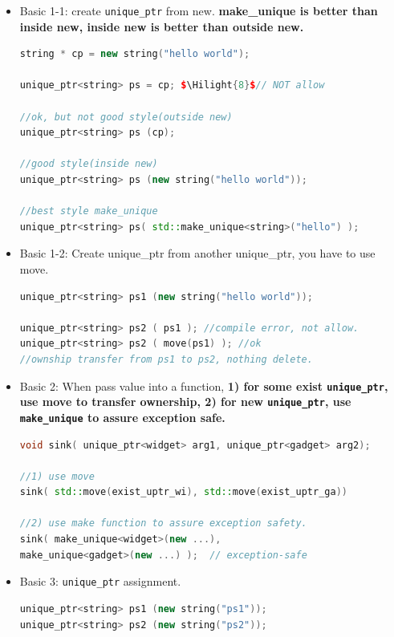 \documentclass[a4paper,12pt,twoside]{book}
\newcommand{\Hilight}[1]{\makebox[0pt][l]{\color{yellow}\rule[-3pt]{#1em}{11pt}}}
\begin{document}
\begin{itemize}

\item Basic 1-1: create \texttt{unique\_ptr} from new.    \textbf{make\_unique is better than inside new, inside new is better than outside new.}
\begin{lstlisting}[frame=single, language=c++]
string * cp = new string("hello world");

unique_ptr<string> ps = cp; $\Hilight{8}$// NOT allow

//ok, but not good style(outside new)
unique_ptr<string> ps (cp);

//good style(inside new)
unique_ptr<string> ps (new string("hello world"));

//best style make_unique
unique_ptr<string> ps( std::make_unique<string>("hello") );
\end{lstlisting}

\item Basic 1-2: Create unique\_ptr from another unique\_ptr, you have to use move.
\begin{lstlisting}[frame=single, language=c++]
unique_ptr<string> ps1 (new string("hello world"));

unique_ptr<string> ps2 ( ps1 ); //compile error, not allow.
unique_ptr<string> ps2 ( move(ps1) ); //ok
//ownship transfer from ps1 to ps2, nothing delete.
\end{lstlisting}

\item Basic 2: When pass value into a function, \textbf{1) for some exist \texttt{unique\_ptr}, use move to transfer ownership, 2) for new \texttt{unique\_ptr}, use \texttt{make\_unique} to assure exception safe.}

\begin{lstlisting}[frame=single, language=c++]
void sink( unique_ptr<widget> arg1, unique_ptr<gadget> arg2);

//1) use move
sink( std::move(exist_uptr_wi), std::move(exist_uptr_ga))

//2) use make function to assure exception safety.
sink( make_unique<widget>(new ...),
make_unique<gadget>(new ...) );  // exception-safe
\end{lstlisting}


\item Basic 3: \texttt{unique\_ptr} assignment.
\begin{lstlisting}[frame=single, language=c++]
unique_ptr<string> ps1 (new string("ps1"));
unique_ptr<string> ps2 (new string("ps2"));


\end{lstlisting}
\end{itemize}
\end{document}
